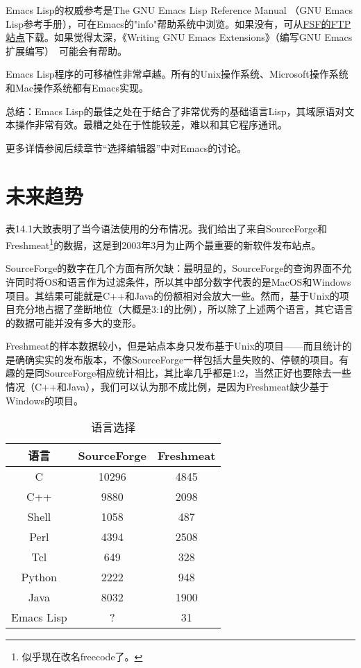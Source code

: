 \documentclass[12pt,oneside]{ctexbook}
\begin{document}
\begin{common-format}
Emacs Lisp的权威参考是The GNU Emacs Lisp Reference Manual （GNU Emacs Lisp参考手册），可在Emacs的"info"帮助系统中浏览。如果没有，可从\href{ftp://ftp.gnu.org/pub/gnu}{FSF的FTP站点}下载。如果觉得太深，《Writing GNU Emacs Extensions》（编写GNU Emacs扩展编写）~\cite{Glickstein}可能会有帮助。

Emacs Lisp程序的可移植性非常卓越。所有的Unix操作系统、Microsoft操作系统和Mac操作系统都有Emacs实现。

总结：Emacs Lisp的最佳之处在于结合了非常优秀的基础语言Lisp，其域原语对文本操作非常有效。最糟之处在于性能较差，难以和其它程序通讯。

更多详情参阅后续章节“选择编辑器”中对Emacs的讨论。


\section{未来趋势}
表14.1大致表明了当今语法使用的分布情况。我们给出了来自SourceForge和Freshmeat\footnote{似乎现在改名freecode了。}的数据，这是到2003年3月为止两个最重要的新软件发布站点。

SourceForge的数字在几个方面有所欠缺：最明显的，SourceForge的查询界面不允许同时将OS和语言作为过滤条件，所以其中部分数字代表的是MacOS和Windows项目。其结果可能就是C++和Java的份额相对会放大一些。然而，基于Unix的项目充分地占据了垄断地位（大概是3:1的比例），所以除了上述两个语言，其它语言的数据可能并没有多大的变形。

Freshmeat的样本数据较小，但是站点本身只发布基于Unix的项目——而且统计的是确确实实的发布版本，不像SourceForge一样包括大量失败的、停顿的项目。有趣的是同SourceForge相应统计相比，其比率几乎都是1:2，当然正好也要除去一些情况（C++和Java），我们可以认为那不成比例，是因为Freshmeat缺少基于Windows的项目。

\begin{table}[H]
\centering
\caption{语言选择}
\label{tab:语言选择}
\medskip
\begin{tabular}{@{}ccc@{}}
\toprule
语言 & SourceForge &  Freshmeat  \\ \midrule
C & 10296 & 4845 \\
C++ & 9880 & 2098 \\
Shell & 1058 & 487\\
Perl & 4394 & 2508\\
Tcl	 & 649 & 328\\
Python & 2222 & 948\\
Java & 8032 & 1900\\
Emacs Lisp & ? & 31
 \\ \bottomrule
\end{tabular}
\end{table}


\end{common-format}
\end{document}
